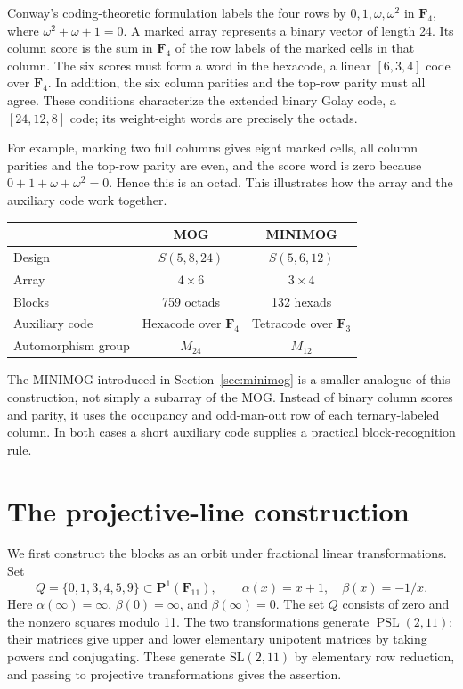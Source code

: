 \documentclass[12pt,letterpaper]{article}
\theoremstyle{definition}\newtheorem{example}[theorem]{Example}
\numberwithin{equation}{section}
\newcommand{\F}{\mathbf F}
\DeclareMathOperator{\PSL}{PSL}
\begin{document}
Conway's coding-theoretic formulation \cite{Co84,CS99} labels the four rows by $0,1,\omega,\omega^2$ in $\F_4$, where $\omega^2+\omega+1=0$. A marked array represents a binary vector of length 24. Its column score is the sum in $\F_4$ of the row labels of the marked cells in that column. The six scores must form a word in the hexacode, a linear $[6,3,4]$ code over $\F_4$. In addition, the six column parities and the top-row parity must all agree. These conditions characterize the extended binary Golay code, a $[24,12,8]$ code; its weight-eight words are precisely the octads.

For example, marking two full columns gives eight marked cells, all column parities and the top-row parity are even, and the score word is zero because $0+1+\omega+\omega^2=0$. Hence this is an octad. This illustrates how the array and the auxiliary code work together.

\begin{center}
\begin{tabular}{lcc}\toprule
 & MOG & MINIMOG\\\midrule
Design & $S(5,8,24)$ & $S(5,6,12)$\\
Array & $4\times6$ & $3\times4$\\
Blocks & 759 octads & 132 hexads\\
Auxiliary code & Hexacode over $\F_4$ & Tetracode over $\F_3$\\
Automorphism group & $M_{24}$ & $M_{12}$\\\bottomrule
\end{tabular}
\end{center}

The MINIMOG introduced in Section~\ref{sec:minimog} is a smaller analogue of this construction, not simply a subarray of the MOG. Instead of binary column scores and parity, it uses the occupancy and odd-man-out row of each ternary-labeled column. In both cases a short auxiliary code supplies a practical block-recognition rule.

\section{The projective-line construction}\label{sec:projective}
We first construct the blocks as an orbit under fractional linear transformations. Set
\[
Q=\{0,1,3,4,5,9\}\subset\mathbf P^1(\F_{11}),
\qquad \alpha(x)=x+1,\quad\beta(x)=-1/x.
\]
Here $\alpha(\infty)=\infty$, $\beta(0)=\infty$, and $\beta(\infty)=0$. The set $Q$ consists of zero and the nonzero squares modulo 11. The two transformations generate $\PSL(2,11)$: their matrices give upper and lower elementary unipotent matrices by taking powers and conjugating. These generate $\mathrm{SL}(2,11)$ by elementary row reduction, and passing to projective transformations gives the assertion.
\end{document}
